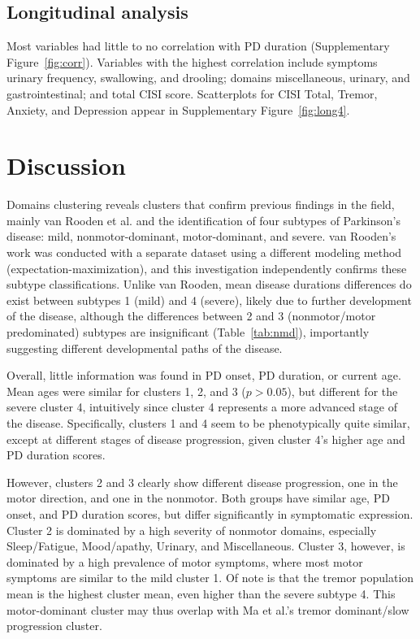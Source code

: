\documentclass[preprint,5p]{elsarticle} %
\begin{document}
\subsection{Longitudinal analysis}

Most variables had little to no correlation with PD duration (Supplementary Figure~\ref{fig:corr}). Variables
with the highest correlation include symptoms urinary frequency, swallowing, and drooling; domains
miscellaneous, urinary, and gastrointestinal; and total CISI score. Scatterplots for CISI Total,
Tremor, Anxiety, and Depression appear in Supplementary Figure~\ref{fig:long4}.

\section{Discussion}

Domains clustering reveals clusters that confirm previous
findings in the field, mainly van Rooden et al.\cite{vanrooden11} and the identification of four
subtypes of Parkinson's disease: mild, nonmotor-dominant, motor-dominant, and severe. van
Rooden's work was conducted with a separate dataset using a different modeling method
(expectation-maximization), and this investigation independently confirms these subtype
classifications. Unlike van Rooden, mean disease durations differences do exist between subtypes 1
(mild) and 4 (severe), likely due to further development of the disease, although the differences
between 2 and 3 (nonmotor/motor predominated) subtypes are insignificant
(Table~\ref{tab:nmd}), importantly suggesting different developmental paths of the disease.

Overall, little information was found in PD onset, PD duration, or current age. Mean ages were
similar for clusters 1, 2, and 3 ($p > 0.05$), but different for the severe cluster 4, intuitively
since cluster 4 represents a more advanced stage of the disease.  Specifically, clusters 1 and 4
seem to be phenotypically quite similar, except at different stages of disease progression, given
cluster 4's higher age and PD duration scores.

However, clusters 2 and 3 clearly show different disease progression, one in
the motor direction, and one in the nonmotor. Both groups have similar age,
PD onset, and PD duration scores, but differ significantly in symptomatic expression.
Cluster 2 is dominated by a high severity of nonmotor domains, especially Sleep/Fatigue,
Mood/apathy, Urinary, and Miscellaneous.  Cluster 3, however, is dominated by a high prevalence
of motor symptoms, where most motor symptoms are similar to the mild cluster 1. Of note is that the
tremor population mean is the highest cluster mean, even higher than the severe subtype 4. This
motor-dominant cluster may thus overlap with Ma et al.'s tremor dominant/slow progression
cluster.\cite{ma15}
\end{document}
